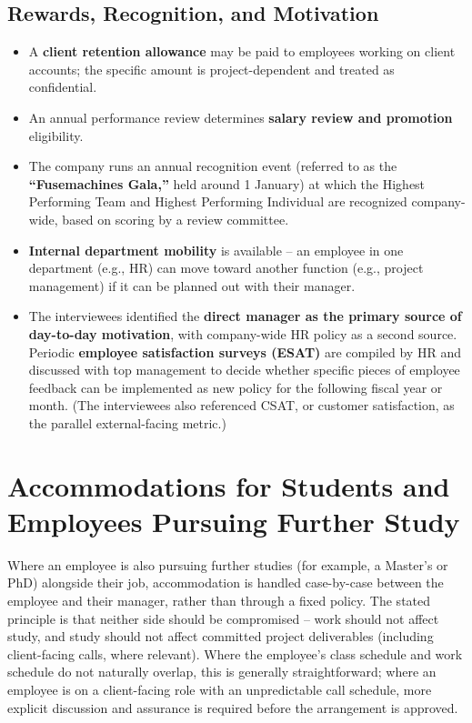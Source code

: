 \documentclass[12pt,a4paper]{report}
\begin{document}
\subsection*{Rewards, Recognition, and Motivation}
\begin{itemize}[leftmargin=1.5cm]
  \item A \textbf{client retention allowance} may be paid to employees working on client accounts; the specific amount is project-dependent and treated as confidential.
  \item An annual performance review determines \textbf{salary review and promotion} eligibility.
  \item The company runs an annual recognition event (referred to as the \textbf{``Fusemachines Gala,''} held around 1 January) at which the Highest Performing Team and Highest Performing Individual are recognized company-wide, based on scoring by a review committee.
  \item \textbf{Internal department mobility} is available -- an employee in one department (e.g., HR) can move toward another function (e.g., project management) if it can be planned out with their manager.
  \item The interviewees identified the \textbf{direct manager as the primary source of day-to-day motivation}, with company-wide HR policy as a second source. Periodic \textbf{employee satisfaction surveys (ESAT)} are compiled by HR and discussed with top management to decide whether specific pieces of employee feedback can be implemented as new policy for the following fiscal year or month. (The interviewees also referenced CSAT, or customer satisfaction, as the parallel external-facing metric.)
\end{itemize}

\section{Accommodations for Students and Employees Pursuing Further Study}
Where an employee is also pursuing further studies (for example, a Master's or PhD) alongside their job, accommodation is handled case-by-case between the employee and their manager, rather than through a fixed policy. The stated principle is that neither side should be compromised -- work should not affect study, and study should not affect committed project deliverables (including client-facing calls, where relevant). Where the employee's class schedule and work schedule do not naturally overlap, this is generally straightforward; where an employee is on a client-facing role with an unpredictable call schedule, more explicit discussion and assurance is required before the arrangement is approved.
\end{document}
